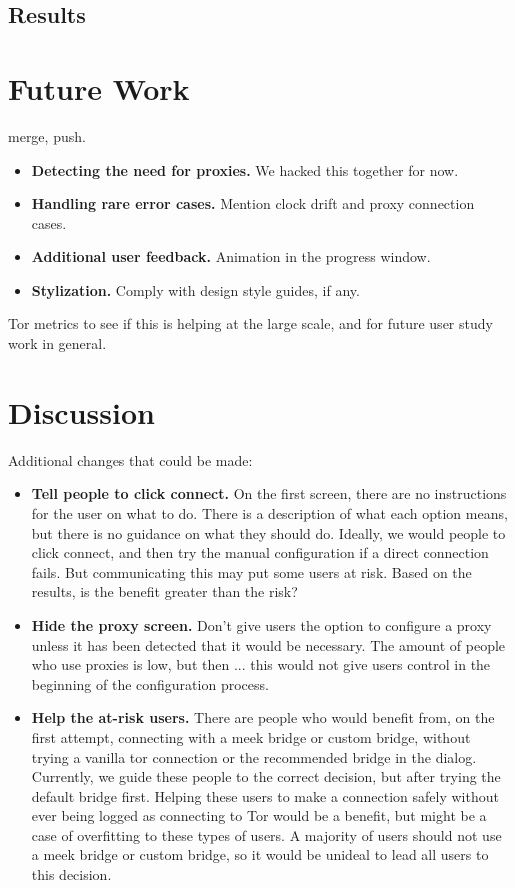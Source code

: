 \documentclass{template}
\begin{document}
\subsection{Results} 

\section{Future Work} 
{\color {red}
 merge, push. 

\begin{itemize} \itemsep1pt \parskip0pt  
\item {\bfseries Detecting the need for proxies.} We hacked this together for now. 
\item {\bfseries Handling rare error cases.} Mention clock drift and proxy connection cases.
\item {\bfseries Additional user feedback.} Animation in the progress window. 
\item {\bfseries Stylization.} Comply with design style guides, if any. 
\end{itemize} 

 Tor metrics to see if this is helping at the large scale, and for future user study work in general. 
}

\section{Discussion} 

Additional changes that could be made: 
\begin{itemize} \itemsep1pt \parskip0pt  
\item {\bfseries Tell people to click connect.} On the first screen, there are no instructions for the user on what to do. There is a description of what each option means, but there is no guidance on what they should do. Ideally, we would people to click connect, and then try the manual configuration if a direct connection fails. But communicating this may put some users at risk. Based on the results, is the benefit greater than the risk?  
\item{\bfseries Hide the proxy screen.} Don't give users the option to configure a proxy unless it has been detected that it would be necessary. The amount of people who use proxies is low, but then ... this would not give users control in the beginning of the configuration process. 
\item{\bfseries Help the at-risk users.} There are people who would benefit from, on the first attempt, connecting with a meek bridge or custom bridge, without trying a vanilla tor connection or the recommended bridge in the dialog. Currently, we guide these people to the correct decision, but after trying the default bridge first. Helping these users to make a connection safely without ever being logged as connecting to Tor would be a benefit, but might be a case of overfitting to these types of users. A majority of users should not use a meek bridge or custom bridge, so it would be unideal to lead all users to this decision.
\end{itemize} 
\end{document}
